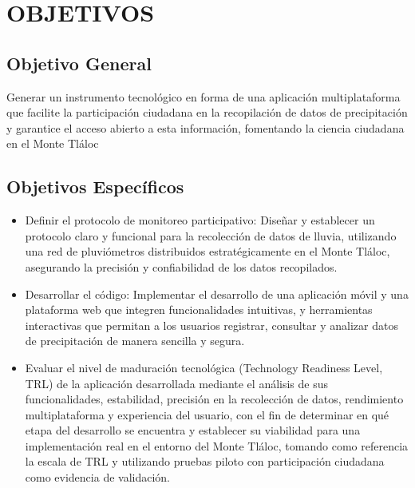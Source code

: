 \chapter{OBJETIVOS}
\section{Objetivo General}

Generar un instrumento tecnológico en forma de una aplicación multiplataforma que
facilite la participación ciudadana en la recopilación de datos de precipitación y
garantice el acceso abierto a esta información, fomentando la ciencia ciudadana en
el Monte Tláloc

\section{Objetivos Específicos}

\begin{itemize}
    \item Definir el protocolo de monitoreo participativo: Diseñar y establecer un protocolo claro y funcional para la recolección de datos de lluvia, utilizando una red de pluviómetros distribuidos estratégicamente en el Monte Tláloc, asegurando la
    precisión y confiabilidad de los datos recopilados.

    \item Desarrollar el código: Implementar el desarrollo de una aplicación móvil y una plataforma web que integren funcionalidades intuitivas, y herramientas interactivas que permitan a los usuarios registrar, consultar y analizar datos de precipitación de
    manera sencilla y segura.
    
   
    \item Evaluar el nivel de maduración tecnológica (Technology Readiness Level, TRL) de la aplicación desarrollada mediante el análisis de sus funcionalidades, estabilidad, precisión en la recolección de datos, rendimiento multiplataforma y experiencia del usuario, con el fin de determinar en qué etapa del desarrollo se encuentra y establecer su viabilidad para una implementación real en el entorno del Monte Tláloc, tomando como referencia la escala de TRL y utilizando pruebas piloto con participación ciudadana como evidencia de validación.
\end{itemize}